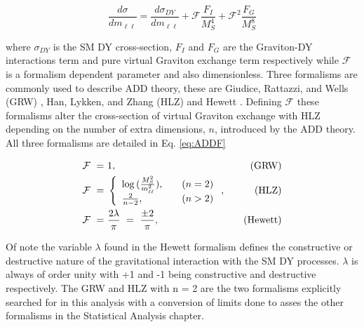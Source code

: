         \begin{equation}
            \frac{d\sigma}{dm_{\ell\ell}} =
                \frac{d\sigma_{DY}}{dm_{\ell\ell}} +
                \mathcal{F}\frac{F_{I}}{M_{S}^{4}} +
                \mathcal{F}^{2}\frac{F_{G}}{M_{S}^{8}}
            \label{eq:ADDcs}
        \end{equation}

        where $\sigma_{DY}$ is the SM DY cross-section, $F_{I}$ and $F_{G}$ are the Graviton-DY interactions term and pure virtual Graviton exchange term respectively while $\mathcal{F}$ is a formalism dependent parameter and also dimensionless. 
        Three formalisms are commonly used to describe ADD theory, these are Giudice, Rattazzi, and Wells (GRW) \cite{Giudice:1998ck}, Han, Lykken, and Zhang (HLZ) \cite{PhysRevD.59.105006} and Hewett \cite{PhysRevLett.82.4765}. Defining $\mathcal{F}$ these formalisms alter the cross-section of virtual Graviton exchange with HLZ depending on the number of extra dimensions, $n$, introduced by the ADD theory. All three formalisms are detailed in Eq. \ref{eq:ADDF}

        \begin{equation}
            \begin{aligned}
                \mathcal{F}~=&~1,   \quad &\text{(GRW)} \\
                \mathcal{F}~=&~  \left\{ 
                    \begin{array}{l l}
                        \log{(\frac{M_{S}^{2}}{m_{\ell\ell}^{2}})},      \quad & (n = 2) \\
                        \frac{2}{n-2},                                   \quad & (n > 2)
                    \end{array} \right.,  \quad &\text{(HLZ)}  \\
                \mathcal{F}~=&~\frac{2\lambda}{\pi}~=~\frac{\pm2}{\pi},     \quad &\text{(Hewett)}
            \end{aligned}
            \label{eq:ADDF}
        \end{equation}

        Of note the variable $\lambda$ found in the Hewett formalism defines the constructive or destructive nature of the gravitational interaction with the SM DY processes. $\lambda$ is always of order unity with +1 and -1 being constructive and destructive respectively.
        The GRW and HLZ with n = 2 are the two formalisms explicitly searched for in this analysis with a conversion of limits done to asses the other formalisms in the Statistical Analysis chapter.

